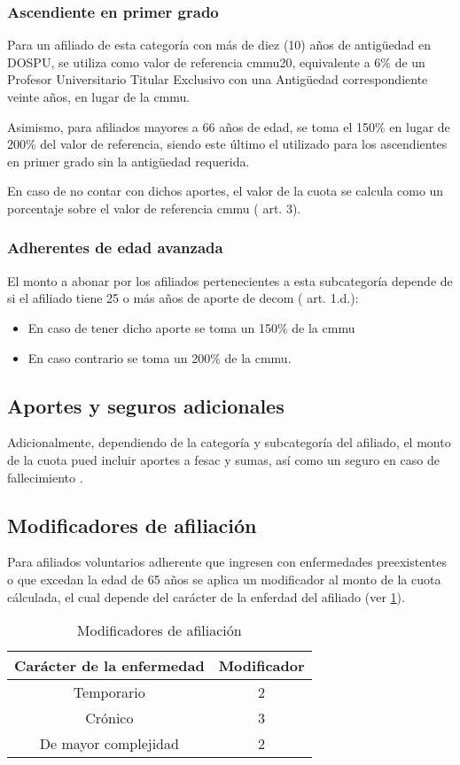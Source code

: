 \subsubsection{Ascendiente en primer grado}
Para un afiliado de esta categoría con más de diez (10) años de antigüedad en DOSPU, se utiliza como valor de referencia \acrshort{cmmu}20, equivalente a 6\% de un Profesor Universitario Titular Exclusivo con una Antigüedad correspondiente veinte años, en lugar de la \acrshort{cmmu}\cite{dospuRes60}.

Asimismo, para afiliados mayores a 66 años de edad, se toma el 150\% en lugar de 200\% del valor de referencia, siendo este último el utilizado para los ascendientes en primer grado sin la antigüedad requerida.

En caso de no contar con dichos aportes, el valor de la cuota se calcula como un porcentaje sobre el valor de referencia \acrshort{cmmu} (\cite{dospuRes21} art. 3).

\subsubsection{Adherentes de edad avanzada}\label{sssec:edad_avanzada}
El monto a abonar por los afiliados pertenecientes a esta subcategoría depende de si el afiliado tiene 25 o más años de aporte de \acrfull{decom} (\cite{dospuRes7} art. 1.d.):
\begin{itemize}
    \item En caso de tener dicho aporte se toma un 150\% de la \acrshort{cmmu}
    \item En caso contrario se toma un 200\% de la \acrshort{cmmu}.
\end{itemize}

\subsection{Aportes y seguros adicionales}
Adicionalmente, dependiendo de la categoría y subcategoría del afiliado, el monto de la cuota pued incluir aportes a \acrfull{fesac} y \acrfull{sumas}, así como un seguro en caso de fallecimiento \cite{dospuRes31, dospuRes43, dospuRes71}.

\subsection{Modificadores de afiliación}
Para afiliados voluntarios adherente que ingresen con enfermedades preexistentes o que excedan la edad de 65 años se aplica un modificador al monto de la cuota cálculada, el cual depende del carácter de la enferdad del afiliado (ver \cref{tbl:modificadores}).

\begin{table}
\begin{tabular}{|c|c|}
    \hline
    Carácter de la enfermedad & Modificador \\ \hline
    Temporario & 2 \\ \hline
    Crónico & 3 \\ \hline
    De mayor complejidad & 2 \\ \hline
\end{tabular}
\caption{Modificadores de afiliación}
\label{tbl:modificadores}
\end{table}
